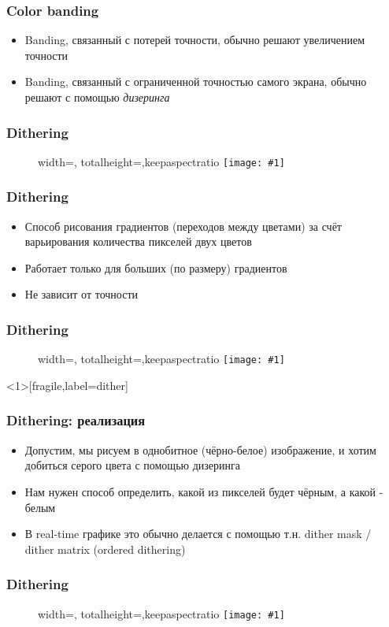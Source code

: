 \documentclass{beamer}
\newcommand{\slideimage}[1]{
  \begin{figure}
    \begin{adjustbox}{width=\textwidth, totalheight=\textheight-2\baselineskip-2\baselineskip,keepaspectratio}
      \texttt{[image: \#1]}
    \end{adjustbox}
  \end{figure}
}
\begin{document}
\begin{frame}[fragile]
\frametitle{Color banding}
\begin{itemize}
\item Banding, связанный с потерей точности, обычно решают увеличением точности
\pause
\item Banding, связанный с ограниченной точностью самого экрана, обычно решают с помощью \textit{дизеринга}
\end{itemize}
\end{frame}

\begin{frame}[fragile]
\frametitle{Dithering}
\slideimage{dither.png}
\end{frame}

\begin{frame}[fragile]
\frametitle{Dithering}
\begin{itemize}
\item Способ рисования градиентов (переходов между цветами) за счёт варьирования количества пикселей двух цветов
\pause
\item Работает только для больших (по размеру) градиентов
\pause
\item Не зависит от точности
\end{itemize}
\end{frame}

\begin{frame}[fragile]
\frametitle{Dithering}
\slideimage{dither2.png}
\end{frame}

\begin{frame}<1>[fragile,label=dither]
\frametitle{Dithering: реализация}
\begin{itemize}
\item Допустим, мы рисуем в однобитное (чёрно-белое) изображение, и хотим добиться серого цвета с помощью дизеринга
\pause
\item Нам нужен способ определить, какой из пикселей будет чёрным, а какой - белым
\pause
\item В real-time графике это обычно делается с помощью т.н. dither mask / dither matrix (ordered dithering)
\end{itemize}
\end{frame}

\begin{frame}[fragile]
\frametitle{Dithering}
\slideimage{dither3.png}
\end{frame}

\end{document}
